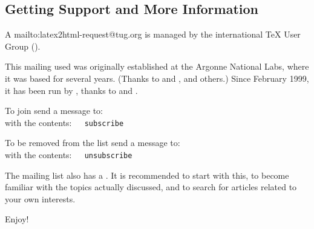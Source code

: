 \subsection[center]{Getting Support and More Information\label{support}}%
%

\begin{changebar}
A %
{mailto:latex2html-request@tug.org}
is managed by the international \TeX{} User Group (\TUGurl).
 
This mailing used was originally established at the Argonne National Labs,
where it was based for several years.
(Thanks to \IanFoster{} and \BobOlson, and others.)
Since February 1999, it has been run by \TUGurl, thanks to
\ArtOgawa{} and \RossMoore.
\end{changebar}

\smallskip\noindent
To join send a message to: 
\\
with the contents:~~\texttt{ subscribe }


\smallskip\noindent
To be removed from the list send a message to: 
\\
with the contents:~~\texttt{ unsubscribe }


\bigskip\noindent
The mailing list also has a 
.
It is recommended to start with this, 
to become familiar with the topics actually discussed,
and to search for articles related to your own interests.

\bigskip
Enjoy!

